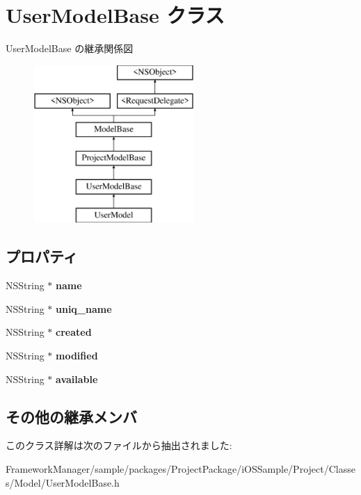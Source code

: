 \hypertarget{interface_user_model_base}{}\section{User\+Model\+Base クラス}
\label{interface_user_model_base}
User\+Model\+Base の継承関係図\begin{figure}[H]
\begin{center}
\leavevmode
\includegraphics[height=6.000000cm]{interface_user_model_base}
\end{center}
\end{figure}
\subsection*{プロパティ}
\begin{DoxyCompactItemize}
\item 
\hypertarget{interface_user_model_base_aa8e9c8254f085bf404dd783235106cde}{}N\+S\+String $\ast$ {\bfseries name}\label{interface_user_model_base_aa8e9c8254f085bf404dd783235106cde}

\item 
\hypertarget{interface_user_model_base_a6e3e2efd8167d8683e01b591d41842f6}{}N\+S\+String $\ast$ {\bfseries uniq\+\_\+name}\label{interface_user_model_base_a6e3e2efd8167d8683e01b591d41842f6}

\item 
\hypertarget{interface_user_model_base_a91a8347d4bef7c4c1cc621d966871d93}{}N\+S\+String $\ast$ {\bfseries created}\label{interface_user_model_base_a91a8347d4bef7c4c1cc621d966871d93}

\item 
\hypertarget{interface_user_model_base_a3f619f3bd1d0dd64903aff808df8b443}{}N\+S\+String $\ast$ {\bfseries modified}\label{interface_user_model_base_a3f619f3bd1d0dd64903aff808df8b443}

\item 
\hypertarget{interface_user_model_base_a1a7d91d662da21ec606d8dc6e659f683}{}N\+S\+String $\ast$ {\bfseries available}\label{interface_user_model_base_a1a7d91d662da21ec606d8dc6e659f683}

\end{DoxyCompactItemize}
\subsection*{その他の継承メンバ}


このクラス詳解は次のファイルから抽出されました\+:\begin{DoxyCompactItemize}
\item 
Framework\+Manager/sample/packages/\+Project\+Package/i\+O\+S\+Sample/\+Project/\+Classes/\+Model/User\+Model\+Base.\+h\end{DoxyCompactItemize}
